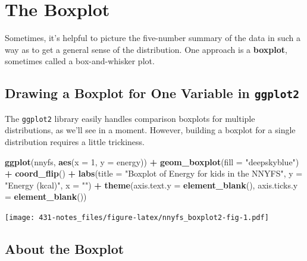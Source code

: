 \documentclass[
]{book}
\newenvironment{Shaded}{\begin{snugshade}}{\end{snugshade}}
\newcommand{\DataTypeTok}[1]{\textcolor[rgb]{0.13,0.29,0.53}{#1}}
\newcommand{\DecValTok}[1]{\textcolor[rgb]{0.00,0.00,0.81}{#1}}
\newcommand{\KeywordTok}[1]{\textcolor[rgb]{0.13,0.29,0.53}{\textbf{#1}}}
\newcommand{\NormalTok}[1]{#1}
\newcommand{\OperatorTok}[1]{\textcolor[rgb]{0.81,0.36,0.00}{\textbf{#1}}}
\newcommand{\StringTok}[1]{\textcolor[rgb]{0.31,0.60,0.02}{#1}}
\begin{document}
\hypertarget{the-boxplot}{%
\section{The Boxplot}\label{the-boxplot}}

Sometimes, it's helpful to picture the five-number summary of the data in such a way as to get a general sense of the distribution. One approach is a \textbf{boxplot}, sometimes called a box-and-whisker plot.

\hypertarget{drawing-a-boxplot-for-one-variable-in-ggplot2}{%
\subsection{\texorpdfstring{Drawing a Boxplot for One Variable in \texttt{ggplot2}}{Drawing a Boxplot for One Variable in ggplot2}}\label{drawing-a-boxplot-for-one-variable-in-ggplot2}}

The \texttt{ggplot2} library easily handles comparison boxplots for multiple distributions, as we'll see in a moment. However, building a boxplot for a single distribution requires a little trickiness.

\begin{Shaded}
\begin{Highlighting}[]
\KeywordTok{ggplot}\NormalTok{(nnyfs, }\KeywordTok{aes}\NormalTok{(}\DataTypeTok{x =} \DecValTok{1}\NormalTok{, }\DataTypeTok{y =}\NormalTok{ energy)) }\OperatorTok{+}\StringTok{ }
\StringTok{    }\KeywordTok{geom_boxplot}\NormalTok{(}\DataTypeTok{fill =} \StringTok{"deepskyblue"}\NormalTok{) }\OperatorTok{+}\StringTok{ }
\StringTok{    }\KeywordTok{coord_flip}\NormalTok{() }\OperatorTok{+}\StringTok{ }
\StringTok{    }\KeywordTok{labs}\NormalTok{(}\DataTypeTok{title =} \StringTok{"Boxplot of Energy for kids in the NNYFS"}\NormalTok{,}
         \DataTypeTok{y =} \StringTok{"Energy (kcal)"}\NormalTok{,}
         \DataTypeTok{x =} \StringTok{""}\NormalTok{) }\OperatorTok{+}
\StringTok{    }\KeywordTok{theme}\NormalTok{(}\DataTypeTok{axis.text.y =} \KeywordTok{element_blank}\NormalTok{(),}
          \DataTypeTok{axis.ticks.y =} \KeywordTok{element_blank}\NormalTok{())}
\end{Highlighting}
\end{Shaded}

\texttt{[image: 431-notes\_files/figure-latex/nnyfs\_boxplot2-fig-1.pdf]}

\hypertarget{about-the-boxplot}{%
\subsection{About the Boxplot}\label{about-the-boxplot}}
\end{document}
